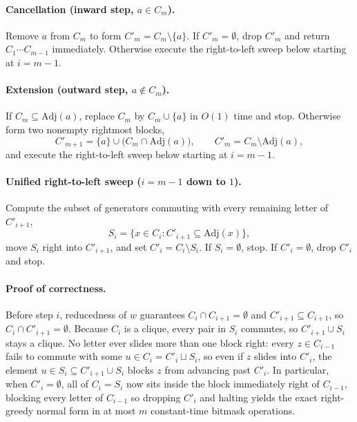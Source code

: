 \paragraph{Cancellation (inward step, $a \in C_m$).}
Remove $a$ from $C_m$ to form $C'_m = C_m \setminus \{a\}$. If $C'_m = \emptyset$, drop $C'_m$ and return $C_1 \cdots C_{m-1}$ immediately. Otherwise execute the right-to-left sweep below starting at $i = m - 1$.

\paragraph{Extension (outward step, $a \notin C_m$).}
If $C_m \subseteq \mathrm{Adj}(a)$, replace $C_m$ by $C_m \cup \{a\}$ in $O(1)$ time and stop. Otherwise form two nonempty rightmost blocks,
\begin{equation}
\label{eq:foata-split}
C'_{m+1} = \{a\} \cup \bigl(C_m \cap \mathrm{Adj}(a)\bigr), \qquad C'_m = C_m \setminus \mathrm{Adj}(a),
\end{equation}
and execute the right-to-left sweep below starting at $i = m - 1$.

\paragraph{Unified right-to-left sweep ($i = m - 1$ down to $1$).}
Compute the subset of generators commuting with every remaining letter of $C'_{i+1}$,
\begin{equation}
\label{eq:foata-sweep}
S_i = \bigl\{x \in C_i : C'_{i+1} \subseteq \mathrm{Adj}(x)\bigr\},
\end{equation}
move $S_i$ right into $C'_{i+1}$, and set $C'_i = C_i \setminus S_i$. If $S_i = \emptyset$, stop. If $C'_i = \emptyset$, drop $C'_i$ and stop.

\paragraph{Proof of correctness.}
Before step $i$, reducedness of $w$ guarantees $C_i \cap C_{i+1} = \emptyset$ and $C'_{i+1} \subseteq C_{i+1}$, so $C_i \cap C'_{i+1} = \emptyset$. Because $C_i$ is a clique, every pair in $S_i$ commutes, so $C'_{i+1} \cup S_i$ stays a clique. No letter ever slides more than one block right: every $z \in C_{i-1}$ fails to commute with some $u \in C_i = C'_i \sqcup S_i$, so even if $z$ slides into $C'_i$, the element $u \in S_i \subseteq C'_{i+1} \cup S_i$ blocks $z$ from advancing past $C'_i$. In particular, when $C'_i = \emptyset$, all of $C_i = S_i$ now sits inside the block immediately right of $C_{i-1}$, blocking every letter of $C_{i-1}$ so dropping $C'_i$ and halting yields the exact right-greedy normal form in at most $m$ constant-time bitmask operations.

